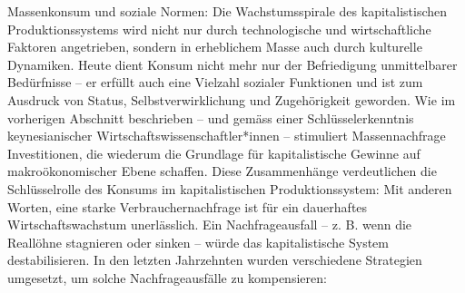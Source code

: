 \documentclass[
  nswissgerman,
  a4paper,
  openany]{book}
\begin{document}
Massenkonsum und soziale Normen: Die Wachstumsspirale des
kapitalistischen Produktionssystems wird nicht nur durch technologische
und wirtschaftliche Faktoren angetrieben, sondern in erheblichem Masse
auch durch kulturelle Dynamiken. Heute dient Konsum nicht mehr nur der
Befriedigung unmittelbarer Bedürfnisse -- er erfüllt auch eine Vielzahl
sozialer Funktionen und ist zum Ausdruck von Status,
Selbstverwirklichung und Zugehörigkeit geworden. Wie im vorherigen
Abschnitt beschrieben -- und gemäss einer Schlüsselerkenntnis
keynesianischer Wirtschaftswissenschaftler*innen -- stimuliert
Massennachfrage Investitionen, die wiederum die Grundlage für
kapitalistische Gewinne auf makroökonomischer Ebene schaffen. Diese
Zusammenhänge verdeutlichen die Schlüsselrolle des Konsums im
kapitalistischen Produktionssystem: Mit anderen Worten, eine starke
Verbrauchernachfrage ist für ein dauerhaftes Wirtschaftswachstum
unerlässlich. Ein Nachfrageausfall -- z. B. wenn die Reallöhne
stagnieren oder sinken -- würde das kapitalistische System
destabilisieren. In den letzten Jahrzehnten wurden verschiedene
Strategien umgesetzt, um solche Nachfrageausfälle zu kompensieren:
\end{document}
